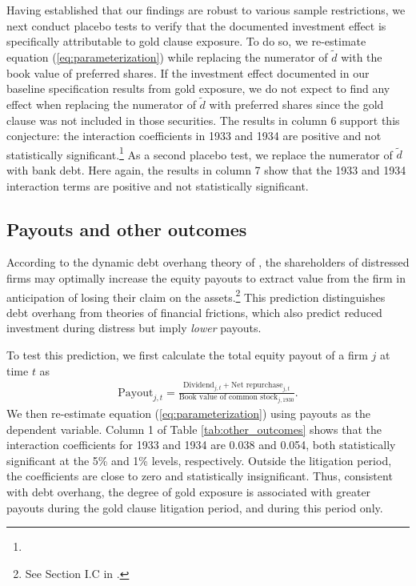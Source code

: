 Having established that our findings are robust to various sample restrictions, we next conduct placebo tests to verify that the documented investment effect is specifically attributable to gold clause exposure. To do so, we re-estimate equation (\ref{eq:parameterization}) while replacing the numerator of $\tilde{d}$ with the book value of preferred shares. If the investment effect documented in our baseline specification results from gold exposure, we do not expect to find any effect when replacing the numerator of $\tilde{d}$ with preferred shares since the gold clause was not included in those securities. The results in column 6 support this conjecture: the interaction coefficients in 1933 and 1934 are positive and not statistically significant.\footnote{} As a second placebo test, we replace the numerator of $\tilde{d}$ with bank debt. Here again, the results in column 7 show that the 1933 and 1934 interaction terms are positive and not statistically significant.

\subsection{Payouts and other outcomes}
\label{sec:payouts}
\noindent
According to the dynamic debt overhang theory of \cite{Hennessy2004}, the shareholders of distressed firms may optimally increase the equity payouts to extract value from the firm in anticipation of losing their claim on the assets.\footnote{See Section I.C in \cite{Hennessy2004}.} This prediction distinguishes debt overhang from theories of financial frictions, which also predict reduced investment during distress but imply \textit{lower} payouts.

To test this prediction, we first calculate the total equity payout of a firm $j$ at time $t$ as
\begin{align*}
    \text{Payout}_{j,t} = \frac{\text{Dividend}_{j,t} + \text{Net repurchase}_{j,t}}{\text{Book value of common stock}_{j,1930}}.
\end{align*}
We then re-estimate equation (\ref{eq:parameterization}) using payouts as the dependent variable. Column 1 of Table \ref{tab:other_outcomes} shows that the interaction coefficients for 1933 and 1934 are 0.038 and 0.054, both statistically significant at the 5\% and 1\% levels, respectively. Outside the litigation period, the coefficients are close to zero and statistically insignificant. Thus, consistent with debt overhang, the degree of gold exposure is associated with greater payouts during the gold clause litigation period, and during this period only.

